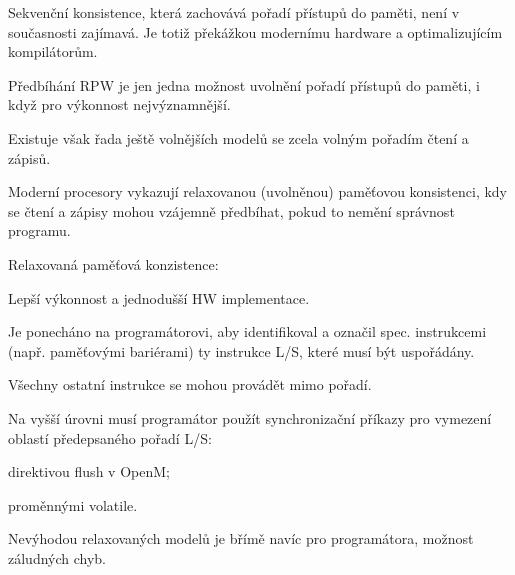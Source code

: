 \begin{compactitem}
    \item Sekvenční konsistence, která zachovává pořadí přístupů do paměti, není v současnosti zajímavá. Je totiž překážkou modernímu hardware a optimalizujícím kompilátorům.

    \item Předbíhání RPW je jen jedna možnost uvolnění pořadí přístupů do paměti, i když pro výkonnost nejvýznamnější.

    \item Existuje však řada ještě volnějších modelů se zcela volným pořadím čtení a zápisů.

    \item Moderní procesory vykazují relaxovanou (uvolněnou) paměťovou konsistenci, kdy se čtení a zápisy mohou vzájemně předbíhat, pokud to nemění správnost programu.

    \item Relaxovaná paměťová konzistence: \begin{compactitem}
        \item Lepší výkonnost a jednodušší HW implementace.
        \item Je ponecháno na programátorovi, aby identifikoval a označil spec. instrukcemi (např. paměťovými bariérami) ty instrukce L/S, které musí být uspořádány.
        \item Všechny ostatní instrukce se mohou provádět mimo pořadí.
    \end{compactitem}

    \item Na vyšší úrovni musí programátor použít synchronizační příkazy pro vymezení oblastí předepsaného pořadí L/S: \begin{compactitem}
        \item direktivou flush v OpenM;
        \item proměnnými volatile.
    \end{compactitem}

    \item Nevýhodou relaxovaných modelů je břímě navíc pro programátora, možnost záludných chyb.
\end{compactitem}
